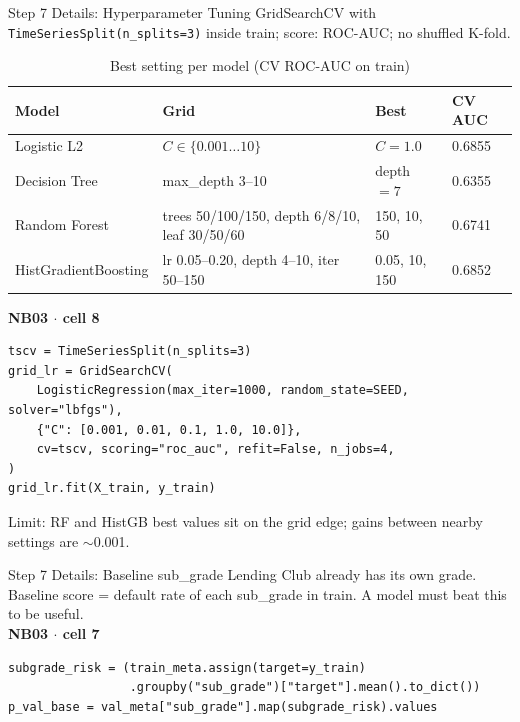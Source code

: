 \documentclass{beamer}
\newcommand{\code}[1]{\texttt{\small #1}}
\begin{document}
\begin{frame}[fragile]{Step 7 Details: Hyperparameter Tuning}
  GridSearchCV with \code{TimeSeriesSplit(n\_splits=3)} inside train; score: ROC-AUC; no shuffled K-fold.
  \begin{table}
    \centering
    \tiny
    \caption{Best setting per model (CV ROC-AUC on train)}
    \begin{tabular}{llll}
      \hline
      \textbf{Model} & \textbf{Grid} & \textbf{Best} & \textbf{CV AUC}\\
      \hline
      Logistic L2 & $C\in\{0.001\ldots10\}$ & $C=1.0$ & 0.6855\\
      Decision Tree & max\_depth 3--10 & depth $=7$ & 0.6355\\
      Random Forest & trees 50/100/150, depth 6/8/10, leaf 30/50/60 & 150, 10, 50 & 0.6741\\
      HistGradientBoosting & lr 0.05--0.20, depth 4--10, iter 50--150 & 0.05, 10, 150 & 0.6852\\
      \hline
    \end{tabular}
  \end{table}
  \textbf{\scriptsize NB03 $\cdot$ cell 8}
\begin{lstlisting}
tscv = TimeSeriesSplit(n_splits=3)
grid_lr = GridSearchCV(
    LogisticRegression(max_iter=1000, random_state=SEED, solver="lbfgs"),
    {"C": [0.001, 0.01, 0.1, 1.0, 10.0]},
    cv=tscv, scoring="roc_auc", refit=False, n_jobs=4,
)
grid_lr.fit(X_train, y_train)
\end{lstlisting}
  \scriptsize Limit: RF and HistGB best values sit on the grid edge; gains between nearby settings are $\sim$0.001.
\end{frame}

\begin{frame}[fragile]{Step 7 Details: Baseline sub\_grade}
  Lending Club already has its own grade. Baseline score = default rate of each sub\_grade in train. A model must beat this to be useful.\\[0.2cm]
  \textbf{\scriptsize NB03 $\cdot$ cell 7}
\begin{lstlisting}
subgrade_risk = (train_meta.assign(target=y_train)
                 .groupby("sub_grade")["target"].mean().to_dict())
p_val_base = val_meta["sub_grade"].map(subgrade_risk).values
\end{lstlisting}
\end{frame}
\end{document}
